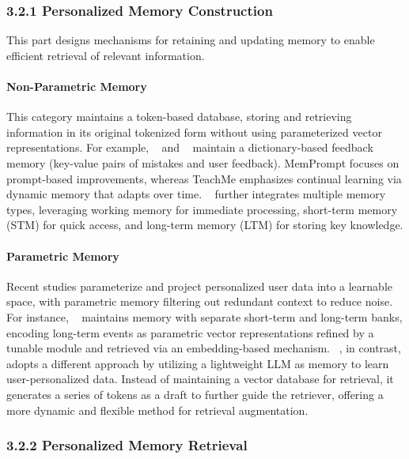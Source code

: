 \subsubsection{3.2.1 Personalized Memory Construction} 

This part designs mechanisms for retaining and updating memory to enable efficient retrieval of relevant information.

\paragraph{Non-Parametric Memory} 
This category maintains a token-based database, storing and retrieving information in its original tokenized form without using parameterized vector representations. For example, 
~\citep{madaan2022memory} and ~\citep{dalvi2022towards} maintain a dictionary-based feedback memory (key-value pairs of mistakes and user feedback).
MemPrompt focuses on prompt-based improvements, whereas TeachMe emphasizes continual learning via dynamic memory that adapts over time.
~\citep{zhang2024llm} further integrates multiple memory types, leveraging working memory for immediate processing, short-term memory (STM) for quick access, and long-term memory (LTM) for storing key knowledge.


\paragraph{Parametric Memory} 
Recent studies parameterize and project personalized user data into a learnable space, with parametric memory filtering out redundant context to reduce noise.
For instance, 
~\citep{li2024hello} maintains memory with separate short-term and long-term banks, encoding long-term events as parametric vector representations refined by a tunable module and retrieved via an embedding-based mechanism.
~\citep{qian2024memorag}, in contrast, adopts a different approach by utilizing a lightweight LLM as memory to learn user-personalized data. Instead of maintaining a vector database for retrieval, it generates a series of tokens as a draft to further guide the retriever, offering a more dynamic and flexible method for retrieval augmentation.



\subsubsection{3.2.2 Personalized Memory Retrieval}

